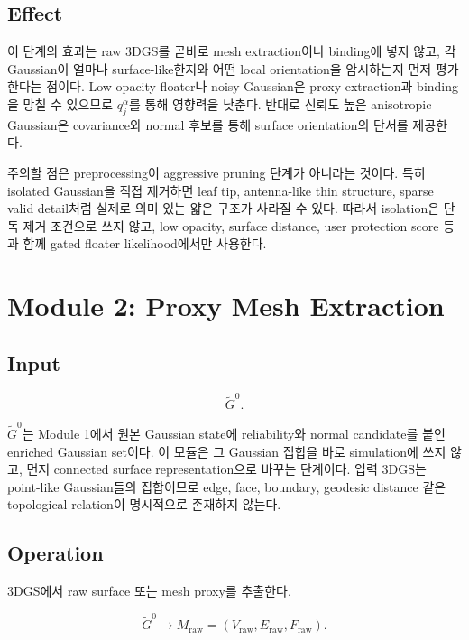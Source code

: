 \documentclass[11pt,a4paper]{article}
\begin{document}
\subsection*{Effect}

이 단계의 효과는 raw 3DGS를 곧바로 mesh extraction이나 binding에 넣지 않고, 각 Gaussian이 얼마나 surface-like한지와 어떤 local orientation을 암시하는지 먼저 평가한다는 점이다.
Low-opacity floater나 noisy Gaussian은 proxy extraction과 binding을 망칠 수 있으므로 $q_j^\alpha$를 통해 영향력을 낮춘다.
반대로 신뢰도 높은 anisotropic Gaussian은 covariance와 normal 후보를 통해 surface orientation의 단서를 제공한다.

주의할 점은 preprocessing이 aggressive pruning 단계가 아니라는 것이다.
특히 isolated Gaussian을 직접 제거하면 leaf tip, antenna-like thin structure, sparse valid detail처럼 실제로 의미 있는 얇은 구조가 사라질 수 있다.
따라서 isolation은 단독 제거 조건으로 쓰지 않고, low opacity, surface distance, user protection score 등과 함께 gated floater likelihood에서만 사용한다.

\section{Module 2: Proxy Mesh Extraction}

\subsection*{Input}

\begin{equation}
\widetilde{G}^0.
\end{equation}

$\widetilde{G}^0$는 Module 1에서 원본 Gaussian state에 reliability와 normal candidate를 붙인 enriched Gaussian set이다.
이 모듈은 그 Gaussian 집합을 바로 simulation에 쓰지 않고, 먼저 connected surface representation으로 바꾸는 단계이다.
입력 3DGS는 point-like Gaussian들의 집합이므로 edge, face, boundary, geodesic distance 같은 topological relation이 명시적으로 존재하지 않는다.

\subsection*{Operation}

3DGS에서 raw surface 또는 mesh proxy를 추출한다.

\begin{equation}
\widetilde{G}^0\rightarrow M_{\mathrm{raw}}=(V_{\mathrm{raw}},E_{\mathrm{raw}},F_{\mathrm{raw}}).
\end{equation}
\end{document}
